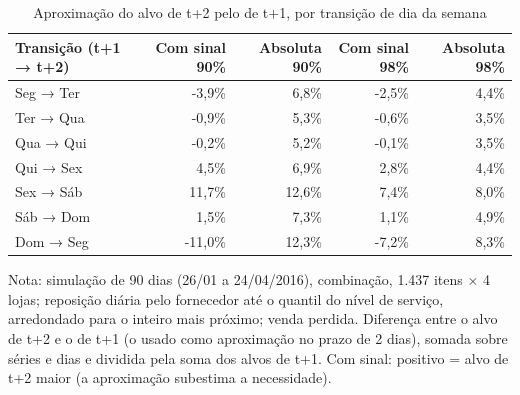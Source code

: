 \begin{table}[htbp]
\centering
\small
\caption{Aproximação do alvo de t+2 pelo de t+1, por transição de dia da semana}
\label{tab:tb_aproximacao_alvo_semana}
\begin{tabular}{lrrrr}
\toprule
Transição (t+1 → t+2) & Com sinal 90\% & Absoluta 90\% & Com sinal 98\% & Absoluta 98\% \\
\midrule
Seg → Ter & -3,9\% & 6,8\% & -2,5\% & 4,4\% \\
Ter → Qua & -0,9\% & 5,3\% & -0,6\% & 3,5\% \\
Qua → Qui & -0,2\% & 5,2\% & -0,1\% & 3,5\% \\
Qui → Sex & 4,5\% & 6,9\% & 2,8\% & 4,4\% \\
Sex → Sáb & 11,7\% & 12,6\% & 7,4\% & 8,0\% \\
Sáb → Dom & 1,5\% & 7,3\% & 1,1\% & 4,9\% \\
Dom → Seg & -11,0\% & 12,3\% & -7,2\% & 8,3\% \\
\bottomrule
\end{tabular}
\par\smallskip
{\footnotesize Nota: simulação de 90 dias (26/01 a 24/04/2016), combinação, 1.437 itens × 4 lojas; reposição diária pelo fornecedor até o quantil do nível de serviço, arredondado para o inteiro mais próximo; venda perdida. Diferença entre o alvo de t+2 e o de t+1 (o usado como aproximação no prazo de 2 dias), somada sobre séries e dias e dividida pela soma dos alvos de t+1. Com sinal: positivo = alvo de t+2 maior (a aproximação subestima a necessidade).}
\end{table}
